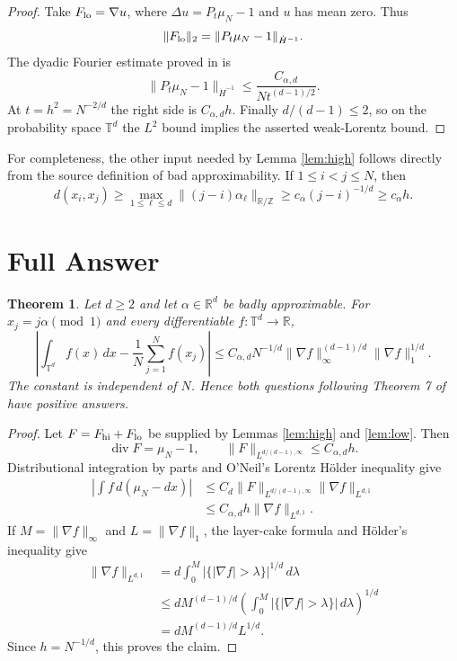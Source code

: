 \documentclass[11pt]{amsart}
\newtheorem{theorem}{Theorem}
\newcommand{\T}{\mathbb T}
\newcommand{\muN}{\mu_N}
\begin{document}
\begin{proof}
Take $F_{\rm lo}=\nabla u$, where
$\Delta u=P_t\muN-1$ and $u$ has mean zero.  Thus
\[
 \|F_{\rm lo}\|_2
 =\|P_t\muN-1\|_{\dot H^{-1}}.
\]
The dyadic Fourier estimate proved in \cite[proofs of Theorems 5 and 6]{BS}
is
\[
 \|P_t\muN-1\|_{\dot H^{-1}}
 \leq \frac{C_{\alpha,d}}{N t^{(d-1)/2}}.
\]
At $t=h^2=N^{-2/d}$ the right side is $C_{\alpha,d}h$.
Finally $d/(d-1)\leq2$, so on the probability space $\T^d$ the $L^2$
bound implies the asserted weak-Lorentz bound.
\end{proof}

For completeness, the other input needed by Lemma \ref{lem:high} follows
directly from the source definition of bad approximability.  If
$1\leq i<j\leq N$, then
\[
 d(x_i,x_j)
 \geq\max_{1\leq\ell\leq d}
 \|(j-i)\alpha_\ell\|_{\mathbb R/\mathbb Z}
 \geq c_\alpha(j-i)^{-1/d}
 \geq c_\alpha h.
\]

\section*{Full Answer}

\begin{theorem}\label{thm:answer}
Let $d\geq2$ and let $\alpha\in\mathbb R^d$ be badly approximable.  For
$x_j=j\alpha\pmod1$ and every differentiable
$f:\T^d\to\mathbb R$,
\[
 \left|\int_{\T^d}f(x)\,dx-\frac1N\sum_{j=1}^Nf(x_j)\right|
 \leq C_{\alpha,d}N^{-1/d}
 \|\nabla f\|_\infty^{(d-1)/d}
 \|\nabla f\|_1^{1/d}.
\]
The constant is independent of $N$.  Hence both questions following
Theorem 7 of \cite{BS} have positive answers.
\end{theorem}

\begin{proof}
Let $F=F_{\rm hi}+F_{\rm lo}$ be supplied by Lemmas
\ref{lem:high} and \ref{lem:low}.  Then
\[
 \operatorname{div}F=\muN-1,
 \qquad
 \|F\|_{L^{d/(d-1),\infty}}\leq C_{\alpha,d}h.
\]
Distributional integration by parts and O'Neil's Lorentz H\"older inequality
\cite{ONeil} give
\begin{align*}
 \left|\int f\,d(\muN-dx)\right|
 &\leq C_d
 \|F\|_{L^{d/(d-1),\infty}}
 \|\nabla f\|_{L^{d,1}}\\
 &\leq C_{\alpha,d}h\|\nabla f\|_{L^{d,1}}.
\end{align*}
If $M=\|\nabla f\|_\infty$ and $L=\|\nabla f\|_1$, the layer-cake
formula and H\"older's inequality give
\begin{align*}
 \|\nabla f\|_{L^{d,1}}
 &=d\int_0^M
   |\{|\nabla f|>\lambda\}|^{1/d}\,d\lambda\\
 &\leq dM^{(d-1)/d}
 \left(\int_0^M|\{|\nabla f|>\lambda\}|\,d\lambda\right)^{1/d}\\
 &=dM^{(d-1)/d}L^{1/d}.
\end{align*}
Since $h=N^{-1/d}$, this proves the claim.
\end{proof}
\end{document}
